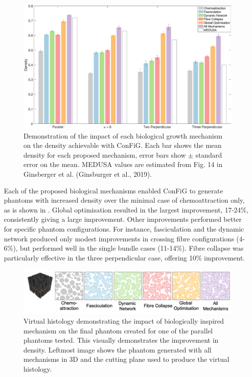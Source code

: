 \begin{figure}
  \centering
  \includegraphics[width=\textwidth]{figures/config/improvements_wfascicle_tight.eps}
  \caption[Impact of biological mechanisms in ConFiG]{Demonstration of the impact of each biological growth mechanism on the density achievable with ConFiG. Each bar shows the mean density for each proposed mechanism, error bars show $\pm$ standard error on the mean. MEDUSA values are estimated from Fig. 14 in Ginsberger et al. (Ginsburger et al., 2019).}
  \label{fig:config_res_improvements}
\end{figure}

Each of the proposed biological mechanisms enabled ConFiG to generate phantoms with increased density over the minimal case of chemoattraction only, as is shown in . Global optimisation resulted in the largest improvement, 17-24\%, consistently giving a large improvement. Other improvements performed better for specific phantom configurations. For instance, fasciculation and the dynamic network produced only modest improvements in crossing fibre configurations (4-6\%), but performed well in the single bundle cases (11-14\%). Fibre collapse was particularly effective in the three perpendicular case, offering 10\% improvement.

\begin{figure}
  \centering
  \includegraphics[width=\textwidth]{figures/config/improvements_virthist.png}
  \caption[Impact of biological mechanisms on virtual histology]{Virtual histology demonstrating the impact of biologically inspired mechanism on the final phantom created for one of the parallel phantoms tested. This visually demonstrates the improvement in density. Leftmost image shows the phantom generated with all mechanisms in 3D and the cutting plane used to produce the virtual histology.  }
  \label{fig:config_res_improvements_virthist}
\end{figure}

